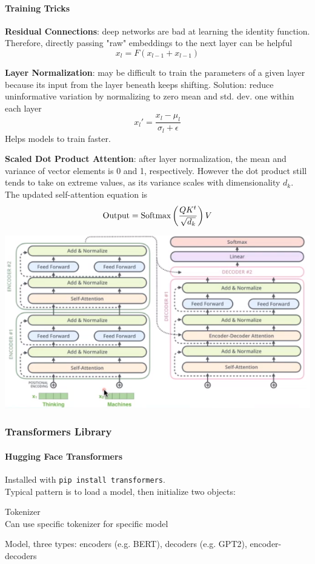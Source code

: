 \documentclass[10pt]{report}
\begin{document}
\paragraph{Training Tricks}
\begin{list}{}{}
	\item \textbf{Residual Connections}: deep networks are bad at learning the identity function. Therefore, directly passing "raw" embeddings to the next layer can be helpful
	$$x_l = F(x_{l-1} + x_{l-1})$$
	\item \textbf{Layer Normalization}: may be difficult to train the parameters of a given layer because its input from the layer beneath keeps shifting. Solution: reduce uninformative variation by normalizing to zero mean and std. dev. one within each layer
	$$x_l' = \frac{x_l - \mu_l}{\sigma_l + \epsilon}$$
	Helps models to train faster.
	\item \textbf{Scaled Dot Product Attention}: after layer normalization, the mean and variance of vector elements is 0 and 1, respectively. However the dot product still tends to take on extreme values, as its variance scales with dimensionality $d_k$. The updated self-attention equation is $$\hbox{Output} = \hbox{Softmax}\left(\frac{QK^t}{\sqrt{d_k}}\right)V$$
\end{list}
\begin{center}
	\includegraphics[scale=0.75]{73.png}
\end{center}
\subsubsection{Transformers Library}
\paragraph{Hugging Face Transformers} Installed with \texttt{pip install transformers}.\\
Typical pattern is to load a model, then initialize two objects:
\begin{list}{}{}
	\item Tokenizer\\
	Can use specific tokenizer for specific model
	\item Model, three types: encoders (e.g. BERT), decoders (e.g. GPT2), encoder-decoders
\end{list}
\end{document}

